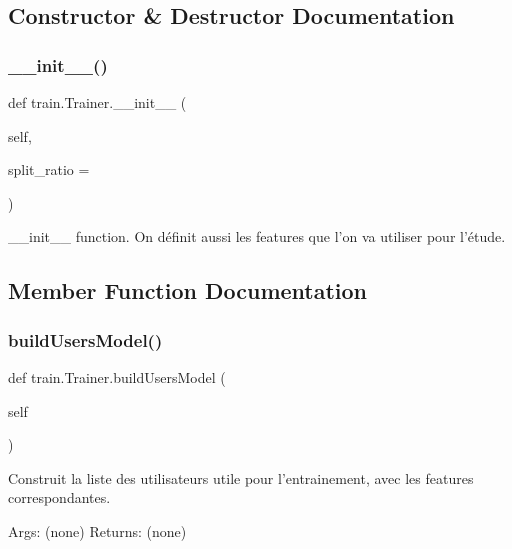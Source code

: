 \subsection{Constructor \& Destructor Documentation}
\mbox{\label{classtrain_1_1_trainer_a6b737f139c2c40d775b82f39ea836c90}} 
\subsubsection{\texorpdfstring{\+\_\+\+\_\+init\+\_\+\+\_\+()}{\_\_init\_\_()}}
{\footnotesize\ttfamily def train.\+Trainer.\+\_\+\+\_\+init\+\_\+\+\_\+ (\begin{DoxyParamCaption}\item[{}]{self,  }\item[{}]{split\+\_\+ratio = {} }\end{DoxyParamCaption})}

\begin{DoxyVerb}__init__ function. On définit aussi les features que l'on va utiliser pour l'étude.
\end{DoxyVerb}
 

\subsection{Member Function Documentation}
\mbox{\label{classtrain_1_1_trainer_aa4cb6b5a4f8b87a958c9b6b62e6204b8}} 
\subsubsection{\texorpdfstring{build\+Users\+Model()}{buildUsersModel()}}
{\footnotesize\ttfamily def train.\+Trainer.\+build\+Users\+Model (\begin{DoxyParamCaption}\item[{}]{self }\end{DoxyParamCaption})}

\begin{DoxyVerb}Construit la liste des utilisateurs utile pour l'entrainement, avec les features correspondantes.

Args:
    (none)
Returns:
    (none)\end{DoxyVerb}
 \mbox{\label{classtrain_1_1_trainer_aff695c7da5cd408f7c89228edff8370d}} 
